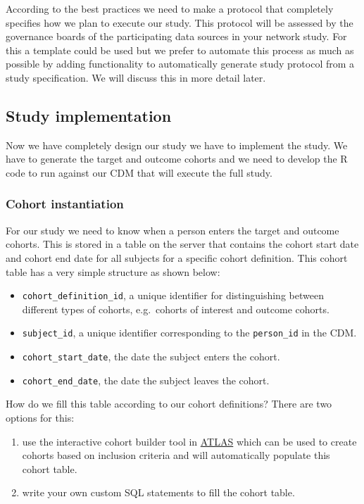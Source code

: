 \documentclass[
]{article}
\providecommand{\tightlist}{%
  \setlength{\itemsep}{0pt}\setlength{\parskip}{0pt}}
\begin{document}
According to the best practices we need to make a protocol that
completely specifies how we plan to execute our study. This protocol
will be assessed by the governance boards of the participating data
sources in your network study. For this a template could be used but we
prefer to automate this process as much as possible by adding
functionality to automatically generate study protocol from a study
specification. We will discuss this in more detail later.

\hypertarget{study-implementation}{%
\subsection{Study implementation}\label{study-implementation}}

Now we have completely design our study we have to implement the study.
We have to generate the target and outcome cohorts and we need to
develop the R code to run against our CDM that will execute the full
study.

\hypertarget{cohort-instantiation}{%
\subsubsection{Cohort instantiation}\label{cohort-instantiation}}

For our study we need to know when a person enters the target and
outcome cohorts. This is stored in a table on the server that contains
the cohort start date and cohort end date for all subjects for a
specific cohort definition. This cohort table has a very simple
structure as shown below:

\begin{itemize}
\tightlist
\item
  \texttt{cohort\_definition\_id}, a unique identifier for
  distinguishing between different types of cohorts, e.g.~cohorts of
  interest and outcome cohorts.
\item
  \texttt{subject\_id}, a unique identifier corresponding to the
  \texttt{person\_id} in the CDM.
\item
  \texttt{cohort\_start\_date}, the date the subject enters the cohort.
\item
  \texttt{cohort\_end\_date}, the date the subject leaves the cohort.
\end{itemize}

How do we fill this table according to our cohort definitions? There are
two options for this:

\begin{enumerate}
\def\labelenumi{\arabic{enumi})}
\item
  use the interactive cohort builder tool in
  \href{www.github.com/OHDSI/ATLAS}{ATLAS} which can be used to create
  cohorts based on inclusion criteria and will automatically populate
  this cohort table.
\item
  write your own custom SQL statements to fill the cohort table.
\end{enumerate}
\end{document}
